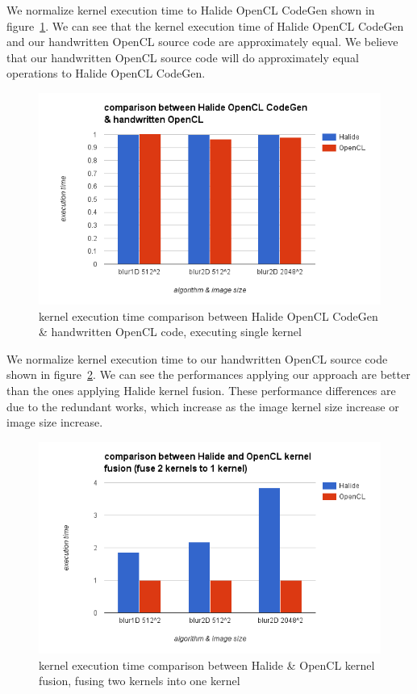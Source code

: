     We normalize kernel execution time to Halide OpenCL CodeGen shown in figure~\ref{fig:my_label_ex_5}. We can see that the kernel execution time of Halide OpenCL CodeGen and our handwritten OpenCL source code are approximately equal. We believe that our handwritten OpenCL source code will do approximately equal operations to Halide OpenCL CodeGen.

\begin{figure}[hbtp]
\centering
\includegraphics[width=14cm]{img/Halide-OpenCL-1ker-comp.png}
\caption{kernel execution time comparison between Halide OpenCL CodeGen \& handwritten OpenCL code, executing single kernel}
\label{fig:my_label_ex_5}
\end{figure}

    We normalize kernel execution time to our handwritten OpenCL source code shown in figure~\ref{fig:my_label_ex_6}. We can see the performances applying our approach are better than the ones applying Halide kernel fusion. These performance differences are due to the redundant works, which increase as the image kernel size increase or image size increase.

\begin{figure}[hbtp]
\centering
\includegraphics[width=14cm]{img/Halide-OpenCL-2ker-comp.png}
\caption{kernel execution time comparison between Halide \& OpenCL kernel fusion, fusing two kernels into one kernel}
\label{fig:my_label_ex_6}
\end{figure}
